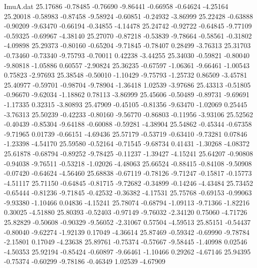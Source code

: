 \begin{filecontents}{ImuA.dat}
  25.17686   -0.78485   -0.76690   -9.86441   -0.66958   -0.64624   -4.25164
  25.20018   -0.58983   -0.87458   -9.58924   -0.60851   -0.24932   -3.86999
  25.22428   -0.63888   -0.90209   -9.63470   -0.66194   -0.34855   -4.14478
  25.24742   -0.92722   -0.64845   -9.77109   -0.59325   -0.69967   -4.38140
  25.27070   -0.87218   -0.53839   -9.78664   -0.58561   -0.31802   -4.09898
  25.29373   -0.80160   -0.65204   -9.71845   -0.78407    0.28499   -3.76313
  25.31703   -0.73460   -0.73340   -9.75793   -0.70011    0.42238   -3.44255
  25.34030   -0.59821   -0.80040   -9.80818   -1.05886    0.60557   -2.90824
  25.36235   -0.67597   -1.06361   -9.66461   -1.00543    0.75823   -2.97693
  25.38548   -0.50010   -1.10429   -9.75793   -1.25732    0.86509   -3.45781
  25.40977   -0.59701   -0.98704   -9.78904   -1.36418    1.02539   -3.97686
  25.43313   -0.51805   -0.96670   -9.62034   -1.18862    0.78113   -3.86999
  25.45606   -0.50489   -0.89731   -9.69691   -1.17335    0.32315   -3.80893
  25.47909   -0.45105   -0.81356   -9.63470   -1.02069    0.25445   -3.76313
  25.50239   -0.42233   -0.80160   -9.56770   -0.86803   -0.11956   -3.93106
  25.52562   -0.40439   -0.85304   -9.64188   -0.60088   -0.59281   -4.38904
  25.54862   -0.45344   -0.67358   -9.71965    0.01739   -0.66151   -4.69436
  25.57179   -0.53719   -0.63410   -9.73281    0.07846   -1.23398   -4.54170
  25.59580   -0.52164   -0.71545   -9.68734    0.41431   -1.30268   -4.08372
  25.61878   -0.68794   -0.89252   -9.78425   -0.11237   -1.39427   -4.15241
  25.64207   -0.90808   -0.94038   -9.76511   -0.53218   -1.02026   -4.48063
  25.66524   -0.88415   -0.84108   -9.50908   -0.07420   -0.64624   -4.56460
  25.68838   -0.67119   -0.78126   -9.71247   -0.15817   -0.15773   -4.51117
  25.71150   -0.64845   -0.81715   -9.72682   -0.34899   -0.14246   -4.43484
  25.73452   -0.65444   -0.81236   -9.71845   -0.42532   -0.36382   -4.17531
  25.75768   -0.69153   -0.99063   -9.93380   -1.10466    0.04836   -4.15241
  25.78074   -0.68794   -1.09113   -9.71366   -1.82216    0.30025   -4.51880
  25.80393   -0.52403   -0.97149   -9.76032   -2.34120    0.75060   -4.71726
  25.82829   -0.50608   -0.90329   -9.56052   -2.31067    0.57504   -4.59513
  25.85151   -0.54437   -0.80040   -9.62274   -1.92139    0.17049   -4.36614
  25.87469   -0.59342   -0.69990   -9.78784   -2.15801    0.17049   -4.23638
  25.89761   -0.75374   -0.57667   -9.58445   -1.40998    0.02546   -4.50353
  25.92194   -0.85424   -0.60897   -9.66461   -1.10466    0.29262   -4.67146
  25.94395   -0.75374   -0.60299   -9.78186   -0.46349    1.02539   -4.67909

\end{filecontents}
